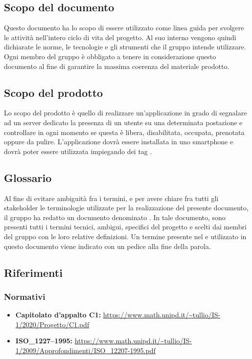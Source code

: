 \subsection{Scopo del documento}
Questo documento ha lo scopo di essere utilizzato come linea guida per svolgere le attività nell'intero ciclo di vita del progetto.
Al suo interno vengono quindi dichiarate le norme, le tecnologie e gli strumenti che il gruppo \Gruppo{} intende utilizzare.
Ogni membro del gruppo è obbligato a tenere in considerazione questo documento al fine di garantire la massima coerenza del materiale prodotto.
	
\subsection{Scopo del prodotto}
Lo scopo del prodotto è quello di realizzare un’applicazione in grado di segnalare ad un server
dedicato la presenza di un utente su una determinata postazione e controllare in ogni momento
se questa è libera, disabilitata, occupata, prenotata oppure da pulire. L’applicazione dovrà essere
installata in uno smartphone  e dovrà poter essere utilizzata impiegando
dei tag .

\subsection{Glossario}
Al fine di evitare ambiguità fra i termini, e per avere chiare fra tutti gli stakeholder le terminologie utilizzate per la realizzazione del presente documento, il gruppo \Gruppo{} ha redatto un documento denominato \Gv{}.
In tale documento, sono presenti tutti i termini tecnici, ambigui, specifici del progetto e scelti dai membri del gruppo con le loro relative definizioni.
Un termine presente nel \Gv{} e utilizzato in questo documento viene indicato con un pedice \glo{} alla fine della parola.

\subsection{Riferimenti} 
\subsubsection{Normativi}
\begin{itemize}
	\item \textbf{Capitolato d'appalto C1:} \url{https://www.math.unipd.it/~tullio/IS-1/2020/Progetto/C1.pdf}
	\item \textbf{ISO\_1227--1995:} \url{https://www.math.unipd.it/~tullio/IS-1/2009/Approfondimenti/ISO_12207-1995.pdf}
\end{itemize}

